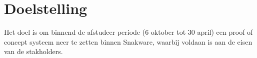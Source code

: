 \section{Doelstelling}
Het doel is om binnend de afstudeer periode (6 oktober tot 30 april) een proof of concept systeem neer te zetten binnen Snakware, waarbij voldaan is aan de eisen van de stakholders.
